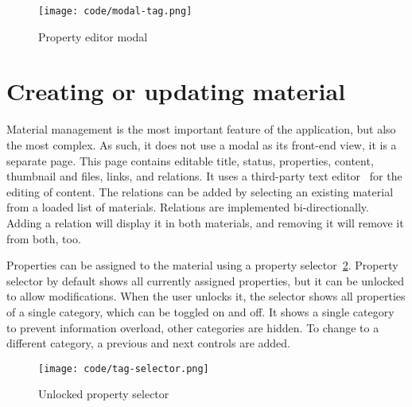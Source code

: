\documentclass[
  digital,     %
  oneside,     %
  nosansbold,  %
  colorbold, %
  lof,         %
  lot,         %
]{fithesis4}
\begin{document}
\begin{figure}[!htbp]
	\begin{center}
		\begin{minipage}{.4\textwidth}
			\texttt{[image: code/modal-tag.png]}
		\end{minipage}
	\end{center}
	\caption{Property editor modal}
	\label{fig:modal-tag}
\end{figure}

\section{Creating or updating material}
\label{sect:material-editor}

Material management is the most important feature of the application, but also the most complex. As such, it does not use a modal as its front-end view, it is a separate page. This page contains editable title, status, properties, content, thumbnail and files, links, and relations. It uses a third-party text editor~\cite{tinymce} for the editing of content. The relations can be added by selecting an existing material from a loaded list of materials. Relations are implemented bi-directionally. Adding a relation will display it in both materials, and removing it will remove it from both, too.

Properties can be assigned to the material using a property selector~\ref{fig:tag-selector}. Property selector by default shows all currently assigned properties, but it can be unlocked to allow modifications. When the user unlocks it, the selector shows all properties of a single category, which can be toggled on and off. It shows a single category to prevent information overload, other categories are hidden. To change to a different category, a previous and next controls are added.

\begin{figure}[!htbp]
	\begin{center}
		\begin{minipage}{.6\textwidth}
			\texttt{[image: code/tag-selector.png]}
		\end{minipage}
	\end{center}
	\caption{Unlocked property selector}
	\label{fig:tag-selector}
\end{figure}
\end{document}
